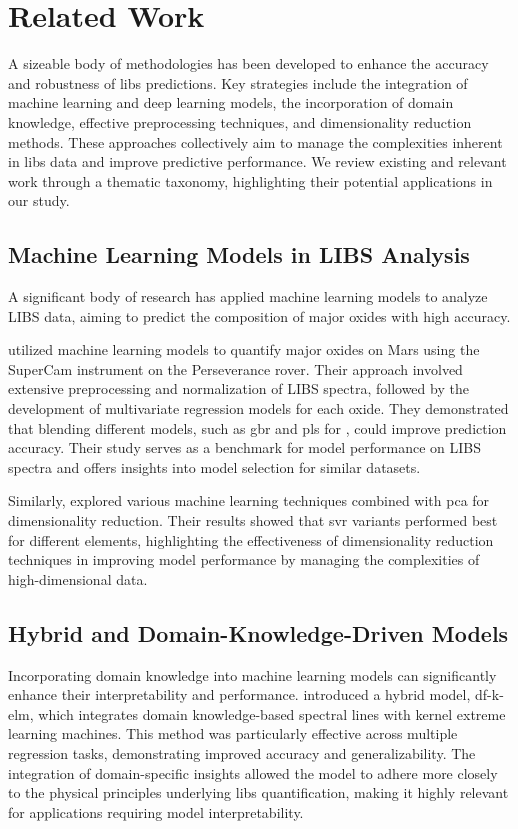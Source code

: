 \section{Related Work}
A sizeable body of methodologies has been developed to enhance the accuracy and robustness of \gls{libs} predictions.
Key strategies include the integration of machine learning and deep learning models, the incorporation of domain knowledge, effective preprocessing techniques, and dimensionality reduction methods.
These approaches collectively aim to manage the complexities inherent in \gls{libs} data and improve predictive performance.
We review existing and relevant work through a thematic taxonomy, highlighting their potential applications in our study.

\subsection{Machine Learning Models in LIBS Analysis}
A significant body of research has applied machine learning models to analyze LIBS data, aiming to predict the composition of major oxides with high accuracy.

\citet{andersonPostlandingMajorElement2022} utilized machine learning models to quantify major oxides on Mars using the SuperCam instrument on the Perseverance rover.
Their approach involved extensive preprocessing and normalization of LIBS spectra, followed by the development of multivariate regression models for each oxide.
They demonstrated that blending different models, such as \gls{gbr} and \gls{pls} for , could improve prediction accuracy.
Their study serves as a benchmark for model performance on LIBS spectra and offers insights into model selection for similar datasets.

Similarly, \citet{rezaei_dimensionality_reduction} explored various machine learning techniques combined with \gls{pca} for dimensionality reduction. Their results showed that \gls{svr} variants performed best for different elements, highlighting the effectiveness of dimensionality reduction techniques in improving model performance by managing the complexities of high-dimensional data.

\subsection{Hybrid and Domain-Knowledge-Driven Models}
Incorporating domain knowledge into machine learning models can significantly enhance their interpretability and performance.
\citet{song_DF-K-ELM} introduced a hybrid model, \gls{df}-\gls{k-elm}, which integrates domain knowledge-based spectral lines with kernel extreme learning machines.
This method was particularly effective across multiple regression tasks, demonstrating improved accuracy and generalizability.
The integration of domain-specific insights allowed the model to adhere more closely to the physical principles underlying \gls{libs} quantification, making it highly relevant for applications requiring model interpretability.


